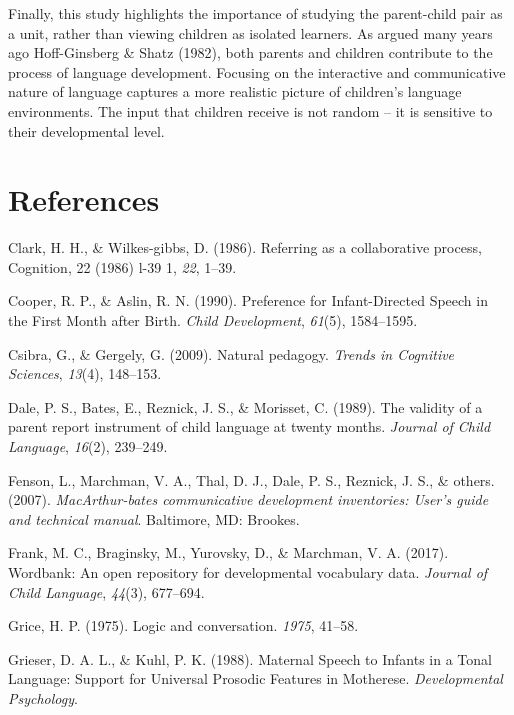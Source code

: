 \documentclass[10pt, letterpaper]{article}
\begin{document}
Finally, this study highlights the importance of studying the
parent-child pair as a unit, rather than viewing children as isolated
learners. As argued many years ago Hoff-Ginsberg \& Shatz (1982), both
parents and children contribute to the process of language development.
Focusing on the interactive and communicative nature of language
captures a more realistic picture of children's language environments.
The input that children receive is not random -- it is sensitive to
their developmental level.

\section{References}\label{references}

\setlength{\parindent}{-0.1in} \setlength{\leftskip}{0.125in} \noindent

\hypertarget{refs}{}
\hypertarget{ref-clark1986}{}
Clark, H. H., \& Wilkes-gibbs, D. (1986). Referring as a collaborative
process, Cognition, 22 (1986) l-39 1, \emph{22}, 1--39.

\hypertarget{ref-cooper1990}{}
Cooper, R. P., \& Aslin, R. N. (1990). Preference for Infant-Directed
Speech in the First Month after Birth. \emph{Child Development},
\emph{61}(5), 1584--1595.

\hypertarget{ref-csibra2009}{}
Csibra, G., \& Gergely, G. (2009). Natural pedagogy. \emph{Trends in
Cognitive Sciences}, \emph{13}(4), 148--153.

\hypertarget{ref-dale1989}{}
Dale, P. S., Bates, E., Reznick, J. S., \& Morisset, C. (1989). The
validity of a parent report instrument of child language at twenty
months. \emph{Journal of Child Language}, \emph{16}(2), 239--249.

\hypertarget{ref-fenson2007}{}
Fenson, L., Marchman, V. A., Thal, D. J., Dale, P. S., Reznick, J. S.,
\& others. (2007). \emph{MacArthur-bates communicative development
inventories: User's guide and technical manual}. Baltimore, MD: Brookes.

\hypertarget{ref-frank2017}{}
Frank, M. C., Braginsky, M., Yurovsky, D., \& Marchman, V. A. (2017).
Wordbank: An open repository for developmental vocabulary data.
\emph{Journal of Child Language}, \emph{44}(3), 677--694.

\hypertarget{ref-grice1975}{}
Grice, H. P. (1975). Logic and conversation. \emph{1975}, 41--58.

\hypertarget{ref-grieser1988}{}
Grieser, D. A. L., \& Kuhl, P. K. (1988). Maternal Speech to Infants in
a Tonal Language: Support for Universal Prosodic Features in Motherese.
\emph{Developmental Psychology}.
\end{document}
